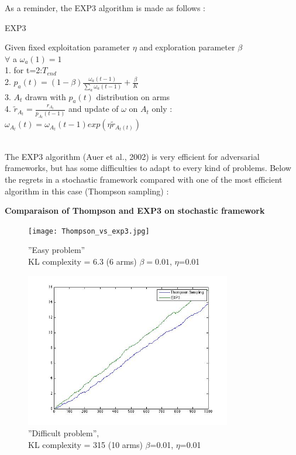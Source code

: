 \documentclass[11pt]{article}
\begin{document}
As a reminder, the EXP3 algorithm is made as follows : 
\FloatBarrier
\begin{algorithm}
\caption{EXP3}\label{RS}
Given fixed exploitation parameter $\eta$ and exploration parameter $\beta$\\
$\forall$ a $\omega_{a}(1)=1$\\
1. for t=2:$T_{end}$\\
2. $p_{a}(t) = (1-\beta)\frac{\omega_{a}(t-1)}{\sum_{a}\omega_{a}(t-1)}+\frac{\beta}{K}$\\
3. $A_{t}$ drawn with $p_{a}(t)$ distribution on arms\\
4. $\tilde{r}_{A_{t}} = \frac{r_{A_{t}}}{p_{A_{t}}(t-1)}$ and update of $\omega$ on $A_{t}$ only : $\omega_{A_{t}}(t)=\omega_{A_{t}}(t-1)exp(\eta \tilde{r}_{A_{t}(t)})$\\
\end{algorithm}
\FloatBarrier
~\\
The EXP3 algorithm (Auer et al., 2002) is very efficient for adversarial frameworks, but has some difficulties to adapt to every kind of problems. Below the regrets in a stochastic framework compared with one of the most efficient algorithm in this case (Thompson sampling) :
\begin{center} \textbf{Comparaison of Thompson and EXP3 on stochastic framework}\end{center}
 \begin{figure}[!h]
   \begin{minipage}[c]{0.5 \linewidth}
   \centering
    \captionsetup{justification=centering,margin=1cm}
      \texttt{[image: Thompson\_vs\_exp3.jpg]}
      \caption{''Easy problem''\\KL complexity = 6.3 (6 arms) $\beta=0.01$, $\eta$=0.01}
   \end{minipage} \hfill
   \begin{minipage}[c]{0.5 \linewidth}
   \centering
   \captionsetup{justification=centering,margin=1cm}
      \includegraphics[width=9cm]{complexPbVs.jpg}
      \caption{''Difficult problem'',\\KL complexity = 315 (10 arms) $\beta$=0.01, $\eta$=0.01}
   \end{minipage} 
\end{figure}
\end{document}
